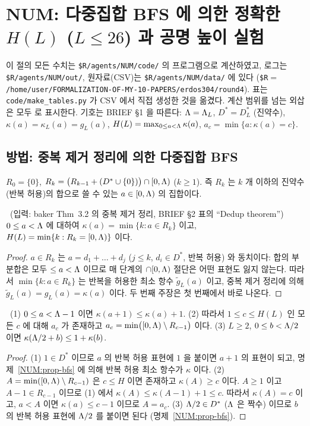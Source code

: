 \section{NUM: 다중집합 BFS 에 의한 정확한 $H(L)$ ($L\le 26$) 과 공명 높이 실험}\label{NUM:sec}

이 절의 모든 수치는 \texttt{\$R/agents/NUM/code/} 의 프로그램으로 계산하였고, 로그는
\texttt{\$R/agents/NUM/out/}, 원자료(CSV)는 \texttt{\$R/agents/NUM/data/} 에 있다
(\texttt{\$R}$=$\texttt{/home/user/FORMALIZATION-OF-MY-10-PAPERS/erdos304/round4}).
표는 \texttt{code/make\_tables.py} 가 CSV 에서 직접 생성한 것을 옮겼다.
계산 범위를 넘는 외삽은 모두 \HEUR 로 표시한다.
기호는 BRIEF \S1 을 따른다: $\Lambda=\Lambda_L$, $D^*=D^*_L$ (진약수), $\kappa(a)=\kappa_L(a)=g_L(a)$,
$H(L)=\max_{0\le a<\Lambda}\kappa(a)$, $a_c=\min\{a:\kappa(a)=c\}$.

\subsection{방법: 중복 제거 정리에 의한 다중집합 BFS}\label{NUM:ssec-method}

\begin{definition}\label{NUM:def-Rk}
$R_0=\{0\}$, $R_k=\bigl(R_{k-1}+(D^*\cup\{0\})\bigr)\cap[0,\Lambda)$ ($k\ge1$).
즉 $R_k$ 는 $k$ 개 이하의 진약수(반복 허용)의 합으로 쓸 수 있는 $a\in[0,\Lambda)$ 의 집합이다.
\end{definition}

\begin{proposition}\label{NUM:prop-bfs}
\PROVED\ (입력: baker Thm~3.2 의 중복 제거 정리, BRIEF \S2 표의 ``Dedup theorem'')
$0\le a<\Lambda$ 에 대하여 $\kappa(a)=\min\{k: a\in R_k\}$ 이고, $H(L)=\min\{k: R_k=[0,\Lambda)\}$ 이다.
\end{proposition}
\begin{proof}
$a\in R_k$ 는 $a=d_1+\dots+d_j$ ($j\le k$, $d_i\in D^*$, 반복 허용) 와 동치이다: 합의 부분합은 모두
$\le a<\Lambda$ 이므로 매 단계의 $\cap[0,\Lambda)$ 절단은 어떤 표현도 잃지 않는다.
따라서 $\min\{k:a\in R_k\}$ 는 반복을 허용한 최소 항수 $\tilde g_L(a)$ 이고, 중복 제거 정리에 의해
$\tilde g_L(a)=g_L(a)=\kappa(a)$ 이다. 두 번째 주장은 첫 번째에서 바로 나온다.
\end{proof}

\begin{lemma}\label{NUM:lem-ac}
\PROVED\ (1) $0\le a<\Lambda-1$ 이면 $\kappa(a+1)\le\kappa(a)+1$.
(2) 따라서 $1\le c\le H(L)$ 인 모든 $c$ 에 대해 $a_c$ 가 존재하고 $a_c=\min\bigl([0,\Lambda)\setminus R_{c-1}\bigr)$ 이다.
(3) $L\ge2$, $0\le b<\Lambda/2$ 이면 $\kappa(\Lambda/2+b)\le 1+\kappa(b)$.
\end{lemma}
\begin{proof}
(1) $1\in D^*$ 이므로 $a$ 의 반복 허용 표현에 $1$ 을 붙이면 $a+1$ 의 표현이 되고, 명제~\ref{NUM:prop-bfs} 에 의해
반복 허용 최소 항수가 $\kappa$ 이다.
(2) $A=\min([0,\Lambda)\setminus R_{c-1})$ 은 $c\le H$ 이면 존재하고 $\kappa(A)\ge c$ 이다. $A\ge1$ 이고
$A-1\in R_{c-1}$ 이므로 (1) 에서 $\kappa(A)\le\kappa(A-1)+1\le c$. 따라서 $\kappa(A)=c$ 이고,
$a<A$ 이면 $\kappa(a)\le c-1$ 이므로 $A=a_c$.
(3) $\Lambda/2\in D^*$ ($\Lambda$ 은 짝수) 이므로 $b$ 의 반복 허용 표현에 $\Lambda/2$ 를 붙이면 된다 (명제~\ref{NUM:prop-bfs}).
\end{proof}

